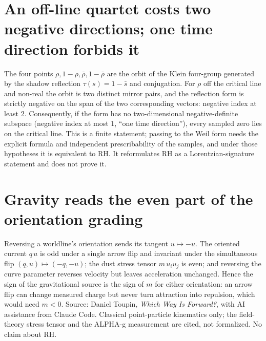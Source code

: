 \documentclass{report}
\theoremstyle{definition}
\begin{document}
\begin{itemize}
\begin{itemize}
\section{An off-line quartet costs two negative directions; one time direction forbids it}
The four points $\rho,1-\rho,\bar\rho,1-\bar\rho$ are the orbit of the Klein four-group generated by the shadow
reflection $\tau(s)=1-\bar s$ and conjugation. For $\rho$ off the critical line and non-real the orbit is two
distinct mirror pairs, and the reflection form is strictly negative on the span of the two corresponding vectors:
negative index at least $2$. Consequently, if the form has no two-dimensional negative-definite subspace
(negative index at most $1$, ``one time direction''), every sampled zero lies on the critical line. This is a
finite statement; passing to the Weil form needs the explicit formula and independent prescribability of the
samples, and under those hypotheses it is equivalent to RH. It reformulates RH as a Lorentzian-signature
statement and does not prove it.
\section{Gravity reads the even part of the orientation grading}
Reversing a worldline's orientation sends its tangent $u\mapsto-u$. The oriented current $q\,u$ is odd under a single arrow
flip and invariant under the simultaneous flip $(q,u)\mapsto(-q,-u)$; the dust stress tensor $m\,u_iu_j$ is even; and reversing the
curve parameter reverses velocity but leaves acceleration unchanged. Hence the sign of the gravitational source is the sign of $m$ for
either orientation: an arrow flip can change measured charge but never turn attraction into repulsion, which would need $m<0$. Source:
Daniel Toupin, \emph{Which Way Is Forward?}, with AI assistance from Claude Code. Classical point-particle kinematics only; the
field-theory stress tensor and the ALPHA-g measurement are cited, not formalized. No claim about RH.

\end{itemize}
\end{itemize}
\end{document}
